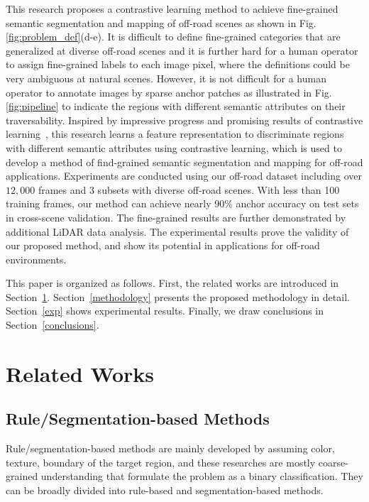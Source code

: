 \documentclass[letterpaper, 10 pt, conference]{ieeeconf}  %
\begin{document}
This research proposes a contrastive learning method to achieve fine-grained semantic segmentation and mapping of off-road scenes as shown in Fig. \ref{fig:problem_def}(d-e).
It is difficult to define fine-grained categories that are generalized at diverse off-road scenes and it is further hard for a human operator to assign fine-grained labels to each image pixel, where the definitions could be very ambiguous at natural scenes. However, it is not difficult for a human operator to annotate images by sparse anchor patches as illustrated in Fig. \ref{fig:pipeline} to indicate the regions with different semantic attributes on their traversability. Inspired by impressive progress and promising results of contrastive learning~\cite{oord2018CPC}\cite{chen2020simple}\cite{he2020momentum}, this research learns a feature representation to discriminate regions with different semantic attributes using contrastive learning, which is used to develop a method of find-grained semantic segmentation and mapping for off-road applications.
Experiments are conducted using our off-road dataset including over $12,000$ frames and 3 subsets with diverse off-road scenes. With less than 100 training frames, our method can achieve nearly 90\% anchor accuracy on test sets in cross-scene validation. The fine-grained results are further demonstrated by additional LiDAR data analysis.
The experimental results prove the validity of our proposed method, and show its potential in applications for off-road environments.

This paper is organized as follows. First, the related works
are introduced in Section~\ref{related_works}. Section~\ref{methodology} presents the proposed methodology in detail. Section~\ref{exp} shows experimental results. Finally, we draw conclusions in Section~\ref{conclusions}.

\section{Related Works} \label{related_works}
\subsection{Rule/Segmentation-based Methods}
Rule/segmentation-based methods are mainly developed by assuming color, texture, boundary of the target region, and these researches are mostly coarse-grained understanding that formulate the problem as a binary classification. They can be broadly divided into rule-based and segmentation-based methods.
\end{document}

